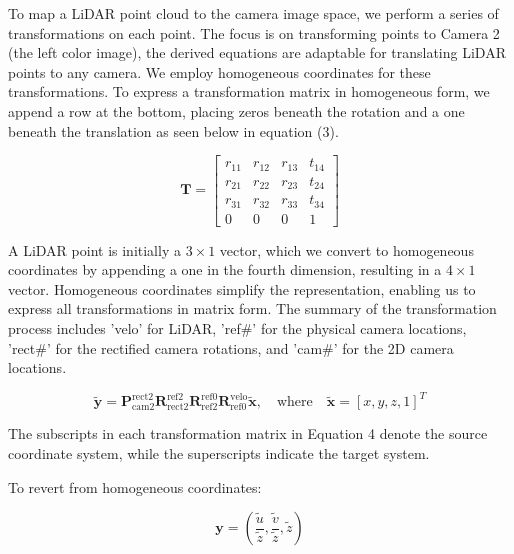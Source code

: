 \documentclass[letterpaper, 10 pt, conference]{ieeeconf}  %
\begin{document}
To map a LiDAR point cloud to the camera image space, we perform a series of transformations on each point. The focus is on transforming points to Camera 2 (the left color image), the derived equations are adaptable for translating LiDAR points to any camera. We employ homogeneous coordinates for these transformations. To express a transformation matrix in homogeneous form, we append a row at the bottom, placing zeros beneath the rotation and a one beneath the translation as seen below in equation (3).

\begin{equation}
\mathbf{T} = \begin{bmatrix}
r_{11} & r_{12} & r_{13} & t_{14} \\
r_{21} & r_{22} & r_{23} & t_{24} \\
r_{31} & r_{32} & r_{33} & t_{34} \\
0 & 0 & 0 & 1
\end{bmatrix}
\label{Equation 3. Homogeneous Rigid Body Transformation.}
\end{equation}

A LiDAR point is initially a \(3 \times 1\) vector, which we convert to homogeneous coordinates by appending a one in the fourth dimension, resulting in a \(4 \times 1\) vector. Homogeneous coordinates simplify the representation, enabling us to express all transformations in matrix form. The summary of the transformation process includes 'velo' for LiDAR, 'ref\#' for the physical camera locations, 'rect\#' for the rectified camera rotations, and 'cam\#' for the 2D camera locations.

\begin{equation}
\tilde{\mathbf{y}} = \mathbf{P}_{\text{cam2}}^{\text{rect2}} \mathbf{R}_{\text{rect2}}^{\text{ref2}} \mathbf{R}_{\text{ref2}}^{\text{ref0}} \mathbf{R}_{\text{ref0}}^{\text{velo}} \tilde{\mathbf{x}}, \quad \text{where} \quad \tilde{\mathbf{x}} = [x, y, z, 1]^T
\label{eq:lidar_to_camera_transformation}
\end{equation}


The subscripts in each transformation matrix in Equation 4 denote the source coordinate system, while the superscripts indicate the target system.

To revert from homogeneous coordinates:

\begin{equation}
\mathbf{y} = \left( \frac{\tilde{u}}{\tilde{z}}, \frac{\tilde{v}}{\tilde{z}}, \tilde{z} \right)
\label{eq:convert_from_homogeneous}
\end{equation}
\end{document}
